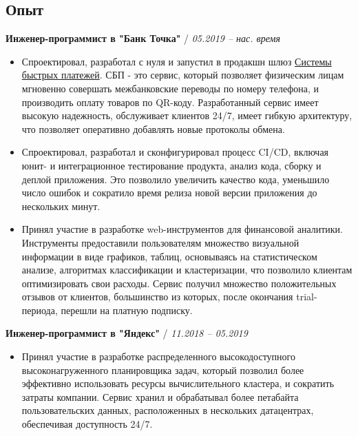 \documentclass[a4paper,10pt]{article}
\newcommand{\notice}[1]{{\textcolor{dark}{\textbf{#1}}}}
\begin{document}
\subsection*{Опыт}

    \begin{adjustwidth}{10pt}{10pt}

        \notice{Инженер-программист в "Банк Точка"} / \textit{05.2019 – нас. время}

        \begin{itemize}

        \item Спроектировал, разработал с нуля и запустил в продакшн шлюз \href{https://sbp.nspk.ru/}{Системы быстрых платежей}. СБП - это сервис, который позволяет физическим лицам мгновенно совершать межбанковские переводы по номеру телефона, и производить оплату товаров по QR-коду. Разработанный сервис имеет высокую надежность, обслуживает клиентов 24/7, имеет гибкую архитектуру, что позволяет оперативно добавлять новые протоколы обмена.

        \item Спроектировал, разработал и сконфигурировал процесс CI/CD, включая юнит- и интеграционное тестирование продукта, анализ кода, сборку и деплой приложения. Это позволило увеличить качество кода, уменьшило число ошибок и сократило время релиза новой версии приложения до нескольких минут.

        \item Принял участие в разработке web-инструментов для финансовой аналитики. Инструменты предоставили пользователям множество визуальной информации в виде графиков, таблиц, основываясь на статистическом анализе, алгоритмах классификации и кластеризации, что позволило клиентам оптимизировать свои расходы. Сервис получил множество положительных отзывов от клиентов, большинство из которых, после окончания trial-периода, перешли на платную подписку.

        \end{itemize}


        \notice{Инженер-программист в "Яндекс"} / \textit{11.2018 – 05.2019}

        \begin{itemize}

        \item Принял участие в разработке распределенного высокодоступного высоконагруженного планировщика задач, который позволил более эффективно использовать ресурсы вычислительного кластера, и сократить затраты компании. Сервис хранил и обрабатывал более петабайта пользовательских данных, расположенных в нескольких датацентрах, обеспечивая доступность 24/7.


\end{itemize}
\end{adjustwidth}
\end{document}
